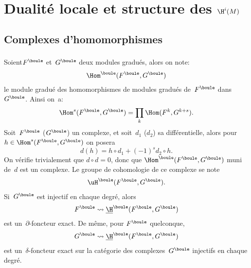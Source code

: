 \chapter{Dualit\'e locale et structure des $\H^i(M)$}\label{V}

\renewcommand{\theequation}{\arabic{equation}}

\section{Complexes d'homomorphismes} \label{V.1}

\subsection{} \label{V.1.1}
Soient\pageoriginale $F^{\boule}$ et~$G^{\boule}$ deux modules gradu\'es, alors on note:
\begin{equation} \label{eq:V.1} \Hom^{\boule}(F^{\boule}, G^{\boule})
\end{equation}
le module gradu\'e des homomorphismes de modules gradu\'es de~$F^{\boule}$ dans~$G^{\boule}$. Ainsi on~a:
\begin{equation} \label{eq:V.2} \Hom^{s}(F^{\boule}, G^{\boule})=\prod_{k}\Hom(F^{k}, G^{k+s}).
\end{equation}
Soit~$F^{\boule}$ (\resp $G^{\boule}$) un complexe, et soit~$d_{1}$ (\resp $d_{2}$) sa diff\'erentielle, alors pour $h\in\Hom^{s}(F^{\boule}, G^{\boule})$ on posera
\begin{equation} \label{eq:V.3} d(h)=h\circ d_{1}+(-1)^{s}d_{2}\circ h.
\end{equation}
On v\'erifie trivialement que $d\circ d=0$, donc que $\Hom^{\boule}(F^{\boule}, G^{\boule})$ muni de~$d$ est un complexe. Le groupe de cohomologie de ce complexe se note
\begin{equation} \label{eq:V.4} \uH^{\boule}(F^{\boule}, G^{\boule}).
\end{equation}
Si~$G^{\boule}$ est injectif en chaque degr\'e, alors
$$F^{\boule}\rightsquigarrow\underline\H^{\boule}(F^{\boule}, G^{\boule})$$
est un~$\partial$-foncteur exact. De m\^eme, pour $F^{\boule}$ quelconque,
$$G^{\boule}\rightsquigarrow\underline\H^{\boule}(F^{\boule}, G^{\boule})$$
est un~$\delta$-foncteur exact sur la cat\'egorie des complexes~$G^{\boule}$ injectifs en chaque degr\'e.

